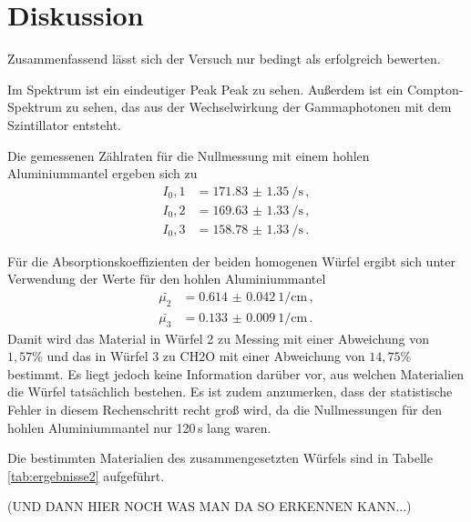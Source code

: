 \section{Diskussion}
\label{sec:Diskussion}

Zusammenfassend lässt sich der Versuch nur bedingt als erfolgreich bewerten.

Im Spektrum ist ein eindeutiger Peak Peak zu sehen. Außerdem ist ein Compton-Spektrum
zu sehen, das aus der Wechselwirkung der Gammaphotonen mit dem Szintillator entsteht.

Die gemessenen Zählraten für die Nullmessung mit einem hohlen Aluminiummantel
ergeben sich zu
\begin{align*}
  I_0,1&=\SI{171.83(135)}{\per\second} \,, \\
  I_0,2&=\SI{169.63(133)}{\per\second} \,, \\
  I_0,3&=\SI{158.78(133)}{\per\second} \,.
\end{align*}

Für die Absorptionskoeffizienten der beiden homogenen Würfel ergibt sich unter Verwendung der
Werte für den hohlen Aluminiummantel
\begin{align*}
  \bar{\mu_2}&= \SI{0.614(42)}{1\per \centi\metre}\,, \\
  \bar{\mu_3}&=\SI{0.133(9)}{1\per \centi\metre} \,.
\end{align*}
Damit wird das Material in Würfel 2 zu Messing mit einer Abweichung von $1{,}57\%$
und das in Würfel 3 zu CH2O mit einer Abweichung von $14{,}75\%$ bestimmt. Es liegt
jedoch keine Information darüber vor, aus welchen Materialien die Würfel tatsächlich bestehen.
Es ist zudem anzumerken, dass der statistische Fehler in diesem Rechenschritt recht groß
wird, da die Nullmessungen für den hohlen Aluminiummantel nur 120\,s lang waren.

Die bestimmten Materialien des zusammengesetzten Würfels sind in Tabelle \ref{tab:ergebnisse2}
aufgeführt.

(UND DANN HIER NOCH WAS MAN DA SO ERKENNEN KANN...)

